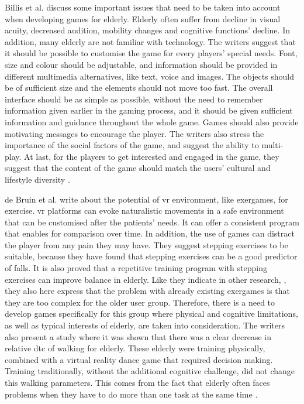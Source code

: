 Billis et al. \cite{Billis} discuss some important issues that need to be taken into account when developing games for elderly. Elderly often suffer from decline in visual acuity, decreased audition, mobility changes and cognitive functions' decline. In addition, many elderly are not familiar with technology. The writers suggest that it should be possible to customise the game for every players' special needs. Font, size and colour should be adjustable, and information should be provided in different multimedia alternatives, like text, voice and images. The objects should be of sufficient size and the elements should not move too fast. The overall interface should be as simple as possible, without the need to remember information given earlier in the gaming process, and it should be given sufficient information and guidance throughout the whole game. Games should also provide motivating messages to encourage the player. The writers also stress the importance of the social factors of the game, and suggest the ability to multi-play. At last, for the players to get interested and engaged in the game, they suggest that the content of the game should match the users' cultural and lifestyle diversity \cite{Billis}.

de Bruin et al. \cite{bruin} write about the potential of \ac{vr} environment, like exergames, for exercise. \ac{vr} platforms can evoke naturalistic movements in a safe environment that can be customised after the patients' needs. It can offer a consistent program that enables for comparison over time. In addition, the use of games can distract the player from any pain they may have. They suggest stepping exercises to be suitable, because they have found that stepping exercises can be a good predictor of falls. It is also proved that a repetitive training program with stepping exercises can improve balance in elderly. Like they indicate in other research, \cite{gerling1} \cite{exergamesforelderly}, they also here express that the problem with already existing exergames is that they are too complex for the older user group. Therefore, there is a need to develop games specifically for this group where physical and cognitive limitations, as well as typical interests of elderly, are taken into consideration. The writers also present a study where it was shown that there was a clear decrease in relative \ac{dtc} of walking for elderly. These elderly were training physically, combined with a virtual reality dance game that required decision making. Training traditionally, without the additional cognitive challenge, did not change this walking parameters. This comes from the fact that elderly often faces problems when they have to do more than one task at the same time \cite{bruin}.

